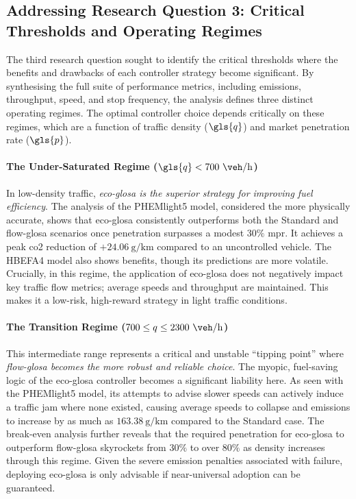 \subsection*{Addressing Research Question 3: Critical Thresholds and Operating Regimes}
The third research question sought to identify the critical thresholds where the benefits and drawbacks of each controller strategy become significant. By synthesising the full suite of performance metrics, including emissions, throughput, speed, and stop frequency, the analysis defines three distinct operating regimes. The optimal controller choice depends critically on these regimes, which are a function of traffic density ($\gls{q}$) and market penetration rate ($\gls{p}$).

\paragraph{The Under-Saturated Regime ($\gls{q} < 700~\unit{\veh\per\hour}$)}
In low-density traffic, \textit{\ac{eco-glosa} is the superior strategy for improving fuel efficiency}. The analysis of the PHEMlight5 model, considered the more physically accurate, shows that \ac{eco-glosa} consistently outperforms both the Standard and \ac{flow-glosa} scenarios once penetration surpasses a modest $30\%$ \ac{mpr}. It achieves a peak \ac{co2} reduction of $+24.06~\unit{\gram\per\kilo\metre}$ compared to an uncontrolled vehicle. The HBEFA4 model also shows benefits, though its predictions are more volatile. Crucially, in this regime, the application of \ac{eco-glosa} does not negatively impact key traffic flow metrics; average speeds and throughput are maintained. This makes it a low-risk, high-reward strategy in light traffic conditions.

\paragraph{The Transition Regime ($700 \le q \le 2300~\unit{\veh\per\hour}$)}
This intermediate range represents a critical and unstable \enquote{tipping point} where \textit{\ac{flow-glosa} becomes the more robust and reliable choice}. The myopic, fuel-saving logic of the \ac{eco-glosa} controller becomes a significant liability here. As seen with the PHEMlight5 model, its attempts to advise slower speeds can actively induce a traffic jam where none existed, causing average speeds to collapse and emissions to increase by as much as $163.38~\unit{\gram\per\kilo\metre}$ compared to the Standard case. The break-even analysis further reveals that the required penetration for \ac{eco-glosa} to outperform \ac{flow-glosa} skyrockets from $30\%$ to over $80\%$ as density increases through this regime. Given the severe emission penalties associated with failure, deploying \ac{eco-glosa} is only advisable if near-universal adoption can be guaranteed.

